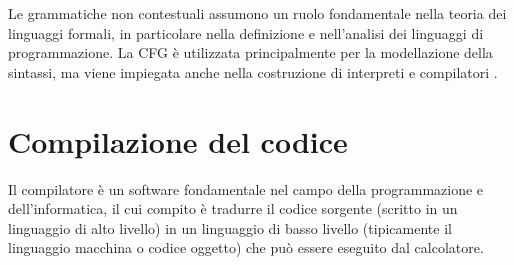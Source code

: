 \documentclass[12pt,a4paper,openright,twoside]{book}
\begin{document}
Le grammatiche non contestuali assumono un ruolo fondamentale nella teoria dei linguaggi formali, in particolare nella definizione e nell’analisi 
dei linguaggi di programmazione. La \ac{CFG} è utilizzata principalmente per la modellazione della sintassi, ma viene impiegata anche nella 
costruzione di interpreti e compilatori \cite{Linz2022}.

\section{Compilazione del codice}
Il compilatore è un software fondamentale nel campo della programmazione e dell’informatica, il cui compito è tradurre il codice sorgente 
(scritto in un linguaggio di alto livello) in un linguaggio di basso livello (tipicamente il linguaggio macchina o codice oggetto) che può 
essere eseguito 
dal calcolatore.
\end{document}
